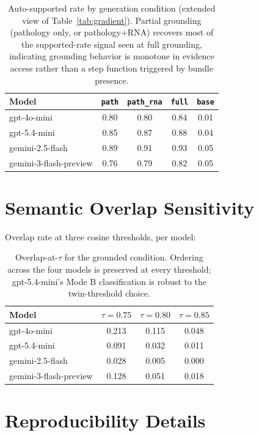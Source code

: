 \documentclass{article}
\theoremstyle{plain}
\begin{document}
\begin{table}[h]
\centering
\small
\setlength{\tabcolsep}{3pt}
\begin{tabular}{lcccc}
\toprule
\textbf{Model} & \texttt{path} & \texttt{path\_rna} & \texttt{full} & \texttt{base} \\
\midrule
gpt-4o-mini             & 0.80 & 0.80 & 0.84 & 0.01 \\
gpt-5.4-mini            & 0.85 & 0.87 & 0.88 & 0.04 \\
gemini-2.5-flash        & 0.89 & 0.91 & 0.93 & 0.05 \\
gemini-3-flash-preview  & 0.76 & 0.79 & 0.82 & 0.05 \\
\bottomrule
\end{tabular}
\caption{Auto-supported rate by generation condition (extended view of Table~\ref{tab:gradient}). Partial grounding (pathology only, or pathology$+$RNA) recovers most of the supported-rate signal seen at full grounding, indicating grounding behavior is monotone in evidence access rather than a step function triggered by bundle presence.}
\label{tab:gradient-app}
\end{table}

\section{Semantic Overlap Sensitivity}
\label{app:overlap-tau}

Overlap rate at three cosine thresholds, per model:

\begin{table}[h]
\centering
\small
\begin{tabular}{lccc}
\toprule
\textbf{Model} & $\tau{=}0.75$ & $\tau{=}0.80$ & $\tau{=}0.85$ \\
\midrule
gpt-4o-mini             & 0.213 & 0.115 & 0.048 \\
gpt-5.4-mini            & 0.091 & 0.032 & 0.011 \\
gemini-2.5-flash        & 0.028 & 0.005 & 0.000 \\
gemini-3-flash-preview  & 0.128 & 0.051 & 0.018 \\
\bottomrule
\end{tabular}
\caption{Overlap-at-$\tau$ for the grounded condition. Ordering across the four models is preserved at every threshold; gpt-5.4-mini's Mode B classification is robust to the twin-threshold choice.}
\label{tab:tau-sens}
\end{table}

\section{Reproducibility Details}
\label{app:reproducibility}
\end{document}
